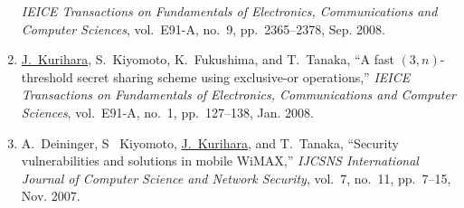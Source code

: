 \begin{enumerate}
       \textit{IEICE Transactions on Fundamentals of Electronics, Communications and Computer Sciences},
       vol.~E91-A, no.~9, pp.~2365--2378, Sep. 2008.
 \item \underline{J.~Kurihara}, S.~Kiyomoto, K.~Fukushima, and
       T.~Tanaka, ``A fast $(3,n)$-threshold secret sharing scheme using
       exclusive-or operations,''
       \textit{IEICE Transactions on Fundamentals of Electronics, Communications and Computer Sciences},
       vol.~E91-A, no.~1, pp.~127--138, Jan. 2008.
 \item A.~Deininger, S~ Kiyomoto, \underline{J.~Kurihara}, and
       T.~Tanaka, ``Security vulnerabilities and solutions in mobile
       WiMAX,'' \textit{IJCSNS International Journal of Computer Science
       and Network Security}, vol.~7, no.~11, pp.~7--15, Nov. 2007.
\end{enumerate}
